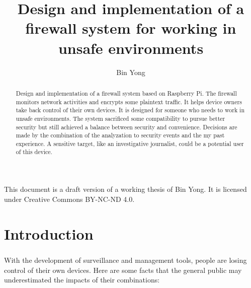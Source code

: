 \documentclass[mscthesis]{usiinfthesis}
\title{Design and implementation of a firewall system for working in unsafe environments} %
\author{Bin Yong} %
\begin{document}

\maketitle %

\frontmatter %

\begin{abstract}
  \paragraph{}
  Design and implementation of a firewall system based on Raspberry Pi. The firewall monitors network activities and encrypts some plaintext traffic. It helps device owners take back control of their own devices. It is designed for someone who needs to work in unsafe environments. The system sacrificed some compatibility to pursue better security but still achieved a balance between security and convenience. Decisions are made by the combination of the analyzation to security events and the my past experience. A sensitive target, like an investigative journalist, could be a potential user of this device.

\end{abstract}

\begin{acknowledgements}
  \paragraph{}
  This document is a draft version of a working thesis of Bin Yong. It is licensed under Creative Commons BY-NC-ND 4.0.
\end{acknowledgements}

\tableofcontents
\listoffigures %
\listoftables %

\mainmatter

\chapter{Introduction}
\paragraph{}
With the development of surveillance and management tools, people are losing control of their own devices. Here are some facts that the general public may underestimated the impacts of their combinations:
\end{document}
